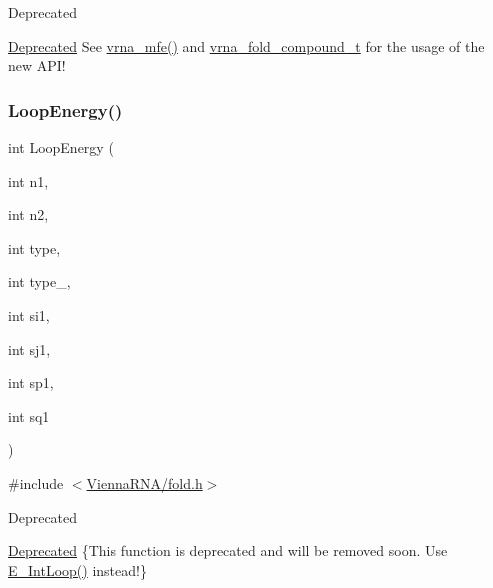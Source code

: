 \begin{DoxyRefDesc}{Deprecated}
\item[\hyperlink{deprecated__deprecated000077}{Deprecated}]See \hyperlink{group__mfe__fold_gabd3b147371ccf25c577f88bbbaf159fd}{vrna\+\_\+mfe()} and \hyperlink{group__fold__compound_ga1b0cef17fd40466cef5968eaeeff6166}{vrna\+\_\+fold\+\_\+compound\+\_\+t} for the usage of the new A\+P\+I!\end{DoxyRefDesc}
\mbox{\label{group__mfe__fold__single_ga2163034a25c6115d894b199e97e03f6c}} 
\subsubsection{\texorpdfstring{Loop\+Energy()}{LoopEnergy()}}
{\footnotesize\ttfamily int Loop\+Energy (\begin{DoxyParamCaption}\item[{int}]{n1,  }\item[{int}]{n2,  }\item[{int}]{type,  }\item[{int}]{type\+\_,  }\item[{int}]{si1,  }\item[{int}]{sj1,  }\item[{int}]{sp1,  }\item[{int}]{sq1 }\end{DoxyParamCaption})}



{\ttfamily \#include $<$\hyperlink{fold_8h}{Vienna\+R\+N\+A/fold.\+h}$>$}

\begin{DoxyRefDesc}{Deprecated}
\item[\hyperlink{deprecated__deprecated000078}{Deprecated}]\{This function is deprecated and will be removed soon. Use \hyperlink{group__loops_gaafbc187b7f78e8e82afb77dd6f3b8fc5}{E\+\_\+\+Int\+Loop()} instead!\} \end{DoxyRefDesc}
\mbox{\label{group__mfe__fold__single_gab327ce11972f5ac069d52c8dedfdb700}} 
